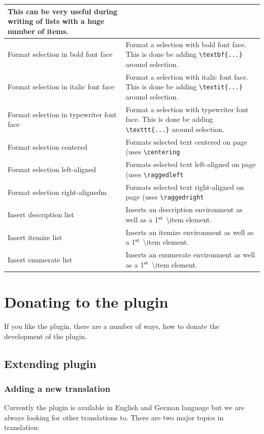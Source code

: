 \documentclass[%
a4paper,%
10pt,%
oneside,%
DIV18,
headsepline,
plainheadsepline,
footsepline,
plainfootsepline,
bibtotoc,%
liststotoc,%
BCOR12mm,%
halfparskip,%
openany,%
]{scrartcl}
\newcommand{\up}[1]{\ensuremath{^\textrm{\scriptsize#1}}}
\begin{document}
\begin{table}[H]
\begin{tabular}{l|p{9cm}}
This can be very useful during writing of lists with a huge number of
items.\\\hline
Format selection in bold font face & Format a selection with bold font face.
This is done be adding \texttt{\textbackslash textbf\{...\}} around selection. \\\hline
Format selection in italic font face & Format a selection with italic font face.
This is done be adding \texttt{\textbackslash textit\{...\}} around selection.\\\hline
Format selection in typewriter font face & Format a selection with typewriter
font face. This is done be adding \texttt{\textbackslash texttt\{...\}} around
selection.\\\hline
Format selection centered & Formats selected text centered on page (uses \texttt{\textbackslash{}centering} \\\hline
Format selection left-aligned & Formats selected text left-aligned on page (uses \texttt{\textbackslash{}raggedleft} \\\hline
Format selection right-alignedm & Formats selected text right-aligned on page (uses \texttt{\textbackslash{}raggedright}\\\hline
Insert description list & Inserts an description environment as well as a 1\up{st} \textbackslash{}item element.\\\hline
Insert itemize list & Inserts an itemize environment as well as a 1\up{st} \textbackslash{}item element.\\\hline
Insert enumerate list & Inserts an enumerate environment as well as a 1\up{st} \textbackslash{}item element.\\\hline

\end{tabular}
\end{table}

\newpage
\section{Donating to the plugin}
If you like the plugin, there are a number of ways, how to donate the
development of the plugin.

\subsection{Extending plugin}

\subsubsection{Adding a new translation}
\label{sec:translating}
Currently the plugin is available in English and German language but
we are always looking for other translations to. There are two major
topics in translation:
\end{document}
